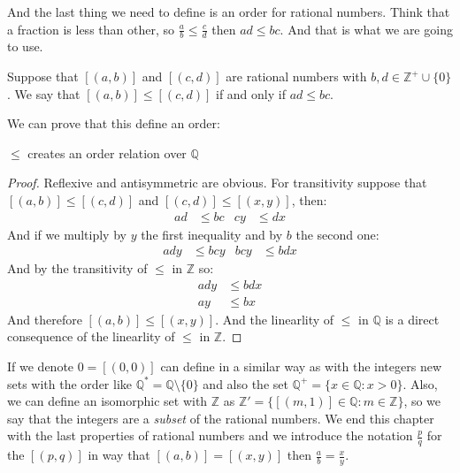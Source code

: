 \documentclass{tufte-handout}
\begin{document}
And the last thing we need to define is an order for rational numbers. Think that a fraction is less than other, so $\frac{a}{b} \le \frac{c}{d}$ then $ad \le bc$. And that is what we are going to use.

\begin{definition}
	Suppose that $[(a, b)]$ and $[(c, d)]$ are rational numbers with $b, d \in \mathbb{Z}^+ \cup \{0\}$. We say that $[(a, b)] \le [(c, d)]$ if and only if $ad \le bc$.
\end{definition}

We can prove that this define an order:
\begin{theorem}
	$\le$ creates an order relation over $\mathbb{Q}$
\end{theorem}
\begin{proof}
	Reflexive and antisymmetric are obvious. For transitivity suppose that $[(a, b)] \le [(c, d)]$ and $[(c, d)] \le [(x, y)]$, then:
	\begin{align*}
		ad &\le bc & cy &\le dx
	\end{align*}
	And if we multiply by $y$ the first inequality and by $b$ the second one:
	\begin{align*}
		ady &\le bcy & bcy&\le bdx
	\end{align*}
	And by the transitivity of $\le$ in $\mathbb{Z}$ so:
	\begin{align*}
		ady &\le bdx\\
		ay &\le bx
	\end{align*}
	And therefore $[(a, b)] \le [(x, y)]$. And the linearlity of $\le$ in $\mathbb{Q}$ is a direct consequence of the linearlity of $\le$ in $\mathbb{Z}$.
\end{proof}

If we denote $0 = [(0, 0)]$ can define in a similar way as with the integers new sets with the order like $\mathbb{Q}^* = \mathbb{Q} \setminus \{0\}$ and also the set $\mathbb{Q}^+ = \{x \in \mathbb{Q}: x > 0\}$. Also, we can define an isomorphic set with $\mathbb{Z}$ as $\mathbb{Z}' = \{[(m, 1)] \in \mathbb{Q}: m \in \mathbb{Z}\}$, so we say that the integers are a \textit{subset} of the rational numbers. We end this chapter with the last properties of rational numbers and we introduce the notation $\frac{p}{q}$ for the $[(p, q)]$ in way that $[(a, b)] = [(x, y)]$ then $\frac{a}{b} = \frac{x}{y}$.
\end{document}
